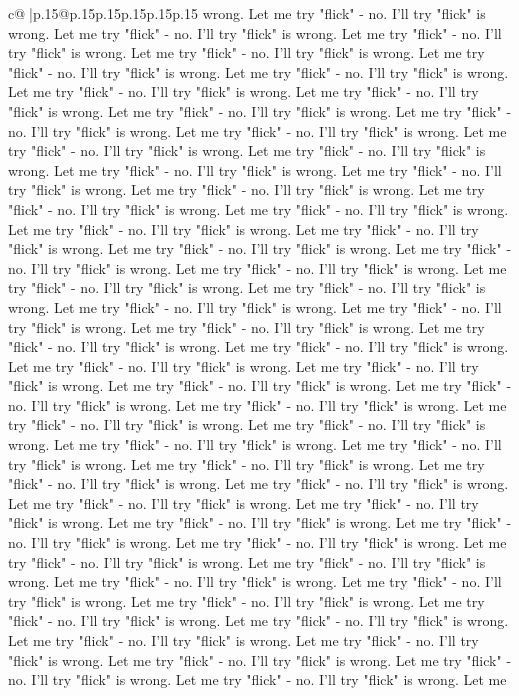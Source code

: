 \documentclass{article}
\begin{document}
{\begin{supertabular}{c@{$\;$}|p{.15\linewidth}@{}p{.15\linewidth}p{.15\linewidth}p{.15\linewidth}p{.15\linewidth}p{.15\linewidth}}
{{{wrong. Let me try "flick" {-} no. I'll try "flick" is wrong. Let me try "flick" {-} no. I'll try "flick" is wrong. Let me try "flick" {-} no. I'll try "flick" is wrong. Let me try "flick" {-} no. I'll try "flick" is wrong. Let me try "flick" {-} no. I'll try "flick" is wrong. Let me try "flick" {-} no. I'll try "flick" is wrong. Let me try "flick" {-} no. I'll try "flick" is wrong. Let me try "flick" {-} no. I'll try "flick" is wrong. Let me try "flick" {-} no. I'll try "flick" is wrong. Let me try "flick" {-} no. I'll try "flick" is wrong. Let me try "flick" {-} no. I'll try "flick" is wrong. Let me try "flick" {-} no. I'll try "flick" is wrong. Let me try "flick" {-} no. I'll try "flick" is wrong. Let me try "flick" {-} no. I'll try "flick" is wrong. Let me try "flick" {-} no. I'll try "flick" is wrong. Let me try "flick" {-} no. I'll try "flick" is wrong. Let me try "flick" {-} no. I'll try "flick" is wrong. Let me try "flick" {-} no. I'll try "flick" is wrong. Let me try "flick" {-} no. I'll try "flick" is wrong. Let me try "flick" {-} no. I'll try "flick" is wrong. Let me try "flick" {-} no. I'll try "flick" is wrong. Let me try "flick" {-} no. I'll try "flick" is wrong. Let me try "flick" {-} no. I'll try "flick" is wrong. Let me try "flick" {-} no. I'll try "flick" is wrong. Let me try "flick" {-} no. I'll try "flick" is wrong. Let me try "flick" {-} no. I'll try "flick" is wrong. Let me try "flick" {-} no. I'll try "flick" is wrong. Let me try "flick" {-} no. I'll try "flick" is wrong. Let me try "flick" {-} no. I'll try "flick" is wrong. Let me try "flick" {-} no. I'll try "flick" is wrong. Let me try "flick" {-} no. I'll try "flick" is wrong. Let me try "flick" {-} no. I'll try "flick" is wrong. Let me try "flick" {-} no. I'll try "flick" is wrong. Let me try "flick" {-} no. I'll try "flick" is wrong. Let me try "flick" {-} no. I'll try "flick" is wrong. Let me try "flick" {-} no. I'll try "flick" is wrong. Let me try "flick" {-} no. I'll try "flick" is wrong. Let me try "flick" {-} no. I'll try "flick" is wrong. Let me try "flick" {-} no. I'll try "flick" is wrong. Let me try "flick" {-} no. I'll try "flick" is wrong. Let me try "flick" {-} no. I'll try "flick" is wrong. Let me try "flick" {-} no. I'll try "flick" is wrong. Let me try "flick" {-} no. I'll try "flick" is wrong. Let me try "flick" {-} no. I'll try "flick" is wrong. Let me try "flick" {-} no. I'll try "flick" is wrong. Let me try "flick" {-} no. I'll try "flick" is wrong. Let me try "flick" {-} no. I'll try "flick" is wrong. Let me try "flick" {-} no. I'll try "flick" is wrong. Let me try "flick" {-} no. I'll try "flick" is wrong. Let me try "flick" {-} no. I'll try "flick" is wrong. Let me try "flick" {-} no. I'll try "flick" is wrong. Let me try "flick" {-} no. I'll try "flick" is wrong. Let me try "flick" {-} no. I'll try "flick" is wrong. Let me try "flick" {-} no. I'll try "flick" is wrong. Let me try "flick" {-} no. I'll try "flick" is wrong. Let me try "flick" {-} no. I'll try "flick" is wrong. Let me try "flick" {-} no. I'll try "flick" is wrong. Let me try "flick" {-} no. I'll try "flick" is wrong. Let me try "flick" {-} no. I'll try "flick" is wrong. Let me }}}
\end{supertabular}}
\end{document}
